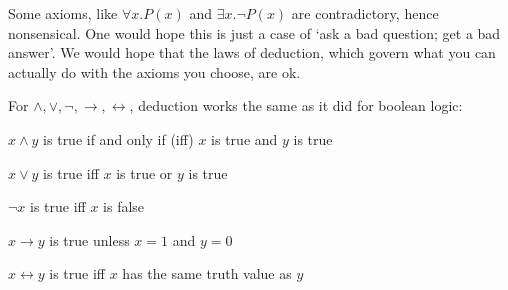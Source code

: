 \documentclass{scrbook}
\renewcommand{\implies}{\to}
\renewcommand{\iff}{\leftrightarrow}
\begin{document}
Some axioms, like $\forall x. P(x)$ and $\exists x. \neg P(x)$ are contradictory, hence nonsensical. One would hope this is just a case of `ask a bad question; get a bad answer'. We would hope that the laws of deduction, which govern what you can actually do with the axioms you choose, are ok. 


For $\wedge,\vee,\neg,\implies,\iff$, deduction works the same as it did for boolean logic:
\begin{trivlist}
\item $x \wedge y$ is true if and only if (iff) $x$ is true and $y$ is true
\item $x \vee y$ is true iff $x$ is true or $y$ is true 
\item $\neg x$ is true iff $x$ is false   
\item $x \implies y$ is true unless $x=1$ and $y=0$  
\item $x\iff y$ is true iff $x$ has the same truth value as $y$  
\end{trivlist}
\end{document}
